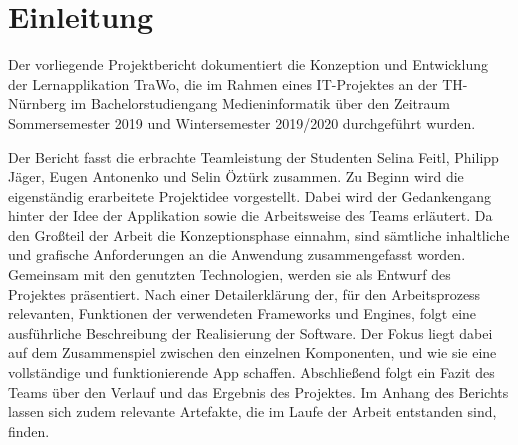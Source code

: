 \chapter{Einleitung}\label{ch:einleitung}
Der vorliegende Projektbericht dokumentiert die Konzeption und Entwicklung der Lernapplikation \glqq TraWo\grqq, die im Rahmen eines IT-Projektes an der TH-Nürnberg im Bachelorstudiengang Medieninformatik über den Zeitraum Sommersemester 2019 und Wintersemester 2019/2020 durchgeführt wurden.

Der Bericht fasst die erbrachte Teamleistung der Studenten Selina Feitl, Philipp Jäger, Eugen Antonenko und Selin Öztürk zusammen. Zu Beginn wird die eigenständig erarbeitete Projektidee vorgestellt. Dabei wird der Gedankengang hinter der Idee der Applikation sowie die Arbeitsweise des Teams erläutert. 
Da den Großteil der Arbeit die Konzeptionsphase einnahm, sind sämtliche inhaltliche und grafische Anforderungen an die Anwendung zusammengefasst worden. Gemeinsam mit den genutzten Technologien, werden sie als Entwurf des Projektes präsentiert.
Nach einer Detailerklärung der, für den Arbeitsprozess relevanten, Funktionen der  verwendeten Frameworks und Engines, folgt eine ausführliche Beschreibung der Realisierung der Software. Der Fokus liegt dabei auf dem Zusammenspiel zwischen den einzelnen Komponenten, und wie sie eine vollständige und funktionierende App schaffen.
Abschließend folgt ein Fazit des Teams über den Verlauf und das Ergebnis des Projektes. Im Anhang des Berichts lassen sich zudem relevante Artefakte, die im Laufe der Arbeit entstanden sind, finden.

